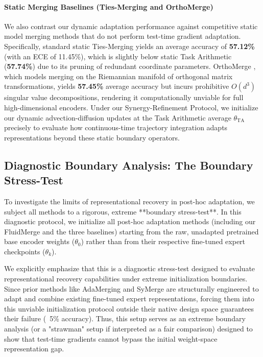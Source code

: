 \paragraph{Static Merging Baselines (Ties-Merging and OrthoMerge)}
We also contrast our dynamic adaptation performance against competitive static model merging methods that do not perform test-time gradient adaptation. Specifically, standard static Ties-Merging \cite{yadav2024ties} yields an average accuracy of \textbf{57.12\%} (with an ECE of 11.45\%), which is slightly below static Task Arithmetic (\textbf{57.74\%}) due to its pruning of redundant coordinate parameters. OrthoMerge \cite{yang2026orthomerge}, which models merging on the Riemannian manifold of orthogonal matrix transformations, yields \textbf{57.45\%} average accuracy but incurs prohibitive $O(d^3)$ singular value decompositions, rendering it computationally unviable for full high-dimensional encoders. Under our Synergy-Refinement Protocol, we initialize our dynamic advection-diffusion updates at the Task Arithmetic average $\theta_{\text{TA}}$ precisely to evaluate how continuous-time trajectory integration adapts representations beyond these static boundary operators.

\subsection{Diagnostic Boundary Analysis: The Boundary Stress-Test}
\label{subsec:boundary_stresstest}

To investigate the limits of representational recovery in post-hoc adaptation, we subject all methods to a rigorous, extreme **boundary stress-test**. In this diagnostic protocol, we initialize all post-hoc adaptation methods (including our FluidMerge and the three baselines) starting from the raw, unadapted pretrained base encoder weights ($\theta_0$) rather than from their respective fine-tuned expert checkpoints ($\theta_k$). 

We explicitly emphasize that this is a diagnostic stress-test designed to evaluate representational recovery capabilities under extreme initialization boundaries. Since prior methods like AdaMerging and SyMerge are structurally engineered to adapt and combine existing fine-tuned expert representations, forcing them into this unviable initialization protocol outside their native design space guarantees their failure (~5\% accuracy). Thus, this setup serves as an extreme boundary analysis (or a "strawman" setup if interpreted as a fair comparison) designed to show that test-time gradients cannot bypass the initial weight-space representation gap.

